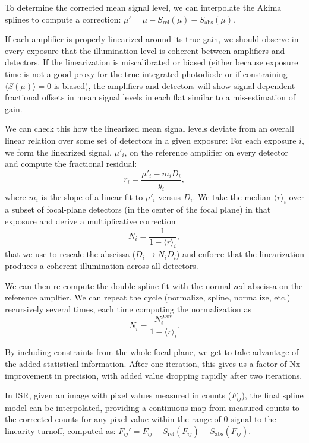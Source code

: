 To determine the corrected mean signal level, we can interpolate the Akima splines to compute a correction: $\mu' = \mu - S_{\mathrm{rel}}(\mu) - S_{\mathrm{abs}}(\mu)$.

If each amplifier is properly linearized around its true gain, we should observe in every exposure that the illumination level is coherent between amplifiers and detectors.
If the linearization is miscalibrated or biased (either because exposure time is not a good proxy for the true integrated photodiode or if constraining $\langle S(\mu)\rangle = 0$ is biased), the amplifiers and detectors will show signal-dependent fractional offsets in mean signal levels in each flat similar to a mis-estimation of gain.

We can check this how the linearized mean signal levels deviate from an overall linear relation over some set of detectors in a given exposure:
For each exposure $i$, we form the linearized signal, $\mu'_i$, on the reference amplifier on every detector and compute the fractional residual:
\begin{equation}
    r_i = \frac{\mu'_i - m_i D_{i}}{y_i},
\end{equation}
where $m_i$ is the slope of a linear fit to $\mu'_i$ versus $D_{i}$.
We take the median $\langle r \rangle_i$ over a subset of focal-plane detectors (in the center of the focal plane) in that exposure and derive a multiplicative correction
\begin{equation}
    N_i = \frac{1}{1 - \langle r \rangle_i},
\end{equation} that we use to rescale the abscissa ($D_{i} \rightarrow N_i D_{i}$) and enforce that the linearization produces a coherent illumination across all detectors.

We can then re-compute the double-spline fit with the normalized abscissa on the reference amplfier. We can repeat the cycle (normalize, spline, normalize, etc.) recursively several times, each time computing the normalization as \begin{equation}
    N_i = \frac{N_i^{\mathrm{prev}}}{1 - \langle r \rangle_i}.
\end{equation}

By including constraints from the whole focal plane, we get to take advantage of the added statistical information.
After one iteration, this gives us a factor of Nx improvement in precision, with added value dropping rapidly after two iterations.

In ISR, given an image with pixel values measured in counts ($F_{ij}$), the final spline model can be interpolated, providing a continuous map from measured counts to the corrected counts for any pixel value within the range of 0 signal to the linearity turnoff, computed as:
$F_{ij}' = F_{ij} - S_{\mathrm{rel}}(F_{ij}) - S_{\mathrm{abs}}(F_{ij})$.

